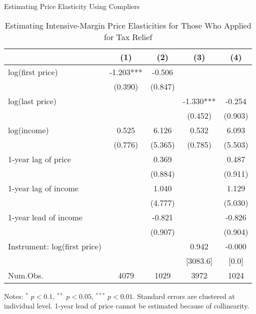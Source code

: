 \documentclass[
  ignorenonframetext,
  aspectratio=169,
]{beamer}
\begin{document}
\begin{frame}{Estimating Price Elasticity Using Compliers}
\protect\hypertarget{estimating-price-elasticity-using-compliers}{}
\begin{table}

\caption{\label{tab:R1Elasticity}Estimating Intensive-Margin Price Elasticities for Those Who Applied for Tax Relief}
\centering
\fontsize{5}{7}\selectfont
\begin{threeparttable}
\begin{tabular}[t]{lcccc}
\toprule
  & (1) & (2) & (3) & (4)\\
\midrule
log(first price) & -1.203*** & -0.506 &  & \\
 & (0.390) & (0.847) &  & \\
log(last price) &  &  & -1.330*** & -0.254\\
 &  &  & (0.452) & (0.903)\\
log(income) & 0.525 & 6.126 & 0.532 & 6.093\\
 & (0.776) & (5.365) & (0.785) & (5.503)\\
1-year lag of price &  & 0.369 &  & 0.487\\
 &  & (0.884) &  & (0.911)\\
1-year lag of income &  & 1.040 &  & 1.129\\
 &  & (4.777) &  & (5.030)\\
1-year lead of income &  & -0.821 &  & -0.826\\
 &  & (0.907) &  & (0.904)\\
\midrule
Instrument: log(first price) &  &  & 0.942 & -0.000\\
 &  &  & [3083.6] & [0.0]\\
Num.Obs. & 4079 & 1029 & 3972 & 1024\\
\bottomrule
\end{tabular}
\begin{tablenotes}
\item Notes: $^{*}$ $p < 0.1$, $^{**}$ $p < 0.05$, $^{***}$ $p < 0.01$. Standard errors are clustered at individual level. 1-year lead of price cannot be estimated because of collinearity.
\end{tablenotes}
\end{threeparttable}
\end{table}
\end{frame}
\end{document}
